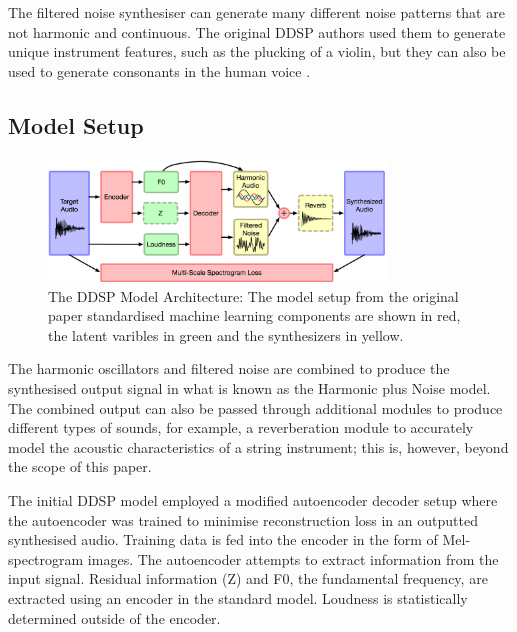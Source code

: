 \vspace{0.5cm}
\vspace{0.5cm}

The filtered noise synthesiser can generate many different noise patterns that are not harmonic and continuous. The original DDSP authors used them to generate unique instrument features, such as the plucking of a violin, but they can also be used to generate consonants in the human voice \cite{SingingDDSP}.

\subsection{Model Setup}

\begin{figure}[H]
    \centering
    \includegraphics[width=0.8\textwidth]{literature_review/DDSPArchitecture.png}
    \caption{The DDSP Model Architecture: The model setup from the original paper\cite{OriginalDDSP} standardised machine learning components are shown in red, the latent varibles in green and the synthesizers in yellow.}
    \label{fig:ddsp_model_setup}
\end{figure}

The harmonic oscillators and filtered noise are combined to produce the synthesised output signal in what is known as the Harmonic plus Noise model. The combined output can also be passed through additional modules to produce different types of sounds, for example, a reverberation module to accurately model the acoustic characteristics of a string instrument; this is, however, beyond the scope of this paper.

The initial DDSP model\cite{OriginalDDSP} employed a modified autoencoder decoder setup where the autoencoder was trained to minimise reconstruction loss in an outputted synthesised audio. Training data is fed into the encoder in the form of Mel-spectrogram images. The autoencoder attempts to extract information from the input signal. Residual information (Z) and F0, the fundamental frequency, are extracted using an encoder in the standard model. Loudness is statistically determined outside of the encoder.

